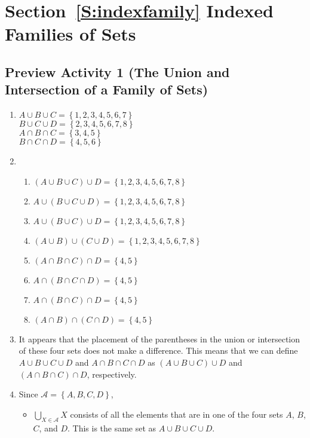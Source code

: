 \section*{Section~\ref{S:indexfamily} Indexed Families of Sets}


\subsection*{Preview Activity 1 (The Union and Intersection of a Family of Sets)}

\begin{enumerate}
\item \begin{multicols}{2}
$A \cup B \cup C = \left\{1, 2, 3, 4, 5, 6, 7 \right\}$ \\
$B \cup C \cup D = \left\{2, 3, 4, 5, 6, 7, 8 \right\}$ \\
$A \cap B \cap C = \left\{3, 4, 5 \right\}$ \\
$B \cap C \cap D = \left\{4, 5, 6 \right\}$ 
\end{multicols}

\item 
\begin{enumerate}
\item $( A \cup B \cup C  ) \cup D = \left\{1, 2, 3, 4, 5, 6, 7, 8 \right\}$
\item $A \cup ( B \cup C  \cup D ) = \left\{1, 2, 3, 4, 5, 6, 7, 8 \right\}$
\item $A \cup ( B \cup C )   \cup D = \left\{1, 2, 3, 4, 5, 6, 7, 8 \right\}$
\item $( A \cup B ) \cup ( C \cup D ) = \left\{1, 2, 3, 4, 5, 6, 7, 8 \right\}$
\item $( A \cap B \cap C  ) \cap D = \left\{4, 5 \right\}$
\item $A \cap ( B \cap C  \cap D ) = \left\{4, 5 \right\}$
\item $A \cap ( B \cap C )   \cap D = \left\{4, 5 \right\}$
\item $( A \cap B ) \cap ( C \cap D ) = \left\{4, 5 \right\}$
\end{enumerate}

\item It appears that the placement of the parentheses in the union or intersection of these four sets does not make a difference.  This means that we can define $A \cup B \cup C \cup D$ and $A \cap B \cap C \cap D$ as $( A \cup B \cup C  ) \cup D$ and 
$( A \cap B \cap C  ) \cap D$, respectively.

\item Since $\mathscr{A} = \left\{A, B, C , D \right\}$,
\begin{itemize}
\item $\bigcup\limits_{X \in \mathscr{A}}^{}X$ consists of all the elements that are in one of the four sets $A$, $B$, $C$, and $D$.  This is the same set as  $A \cup B \cup C \cup D$.


\end{itemize}
\end{enumerate}
